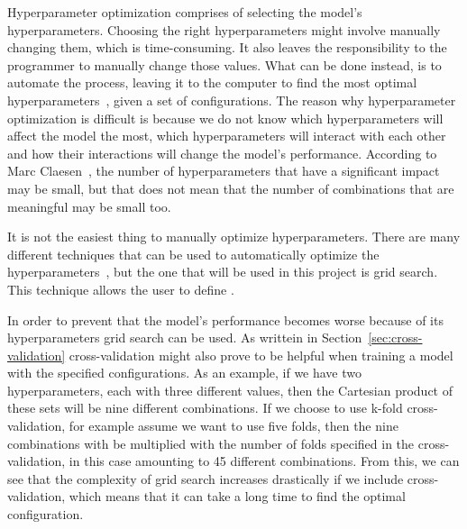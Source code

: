 Hyperparameter optimization comprises of selecting the model's hyperparameters. Choosing the right hyperparameters might involve manually changing them, which is time-consuming. It also leaves the responsibility to the programmer to manually change those values. What can be done instead, is to automate the process, leaving it to the computer to find the most optimal hyperparameters~\cite{automated-machine-learning}, given a set of configurations. The reason why hyperparameter optimization is difficult is because we do not know which hyperparameters will affect the model the most, which hyperparameters will interact with each other and how their interactions will change the model's performance. According to Marc Claesen~\cite{hyperparam-search}, the number of hyperparameters that have a significant impact may be small, but that does not mean that the number of combinations that are meaningful may be small too. 

It is not the easiest thing to manually optimize hyperparameters. There are many different techniques that can be used to automatically optimize the hyperparameters~\cite{automated-machine-learning}, but the one that will be used in this project is grid search. This technique allows the user to define .


In order to prevent that the model's performance becomes worse because of its hyperparameters grid search can be used. As writtein in Section~\ref{sec:cross-validation} cross-validation might also prove to be helpful when training a model with the specified configurations. As an example, if we have two hyperparameters, each with three different values, then the Cartesian product of these sets will be nine different combinations. If we choose to use k-fold cross-validation, for example assume we want to use five folds, then the nine combinations with be multiplied with the number of folds specified in the cross-validation, in this case amounting to 45 different combinations. From this, we can see that the complexity of grid search increases drastically if we include cross-validation, which means that it can take a long time to find the optimal configuration.







